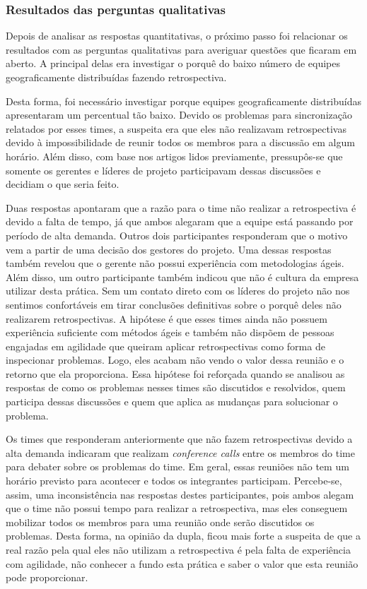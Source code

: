 \subsubsection*{Resultados das perguntas qualitativas}

Depois de analisar as respostas quantitativas, o próximo passo foi relacionar os resultados com as perguntas qualitativas para averiguar questões que ficaram em aberto. A principal delas era investigar o porquê do baixo número de equipes geograficamente distribuídas fazendo retrospectiva.
  
Desta forma, foi necessário investigar porque equipes geograficamente distribuídas apresentaram um percentual tão baixo. Devido os problemas para sincronização relatados por esses times, a suspeita era que eles não realizavam retrospectivas devido à impossibilidade de reunir todos os membros para a discussão em algum horário. Além disso, com base nos artigos lidos previamente, pressupôs-se que somente os gerentes e líderes de projeto participavam dessas discussões e decidiam o que seria feito.

Duas respostas apontaram que a razão para o time não realizar a retrospectiva é devido a falta de tempo, já que ambos alegaram que a equipe está passando por período de alta demanda. Outros dois participantes responderam que o motivo vem a partir de uma decisão dos gestores do projeto. Uma dessas respostas também revelou que o gerente não possui experiência com metodologias ágeis. Além disso, um outro participante também indicou que não é cultura da empresa utilizar desta prática. Sem um contato direto com os líderes do projeto não nos sentimos confortáveis em tirar conclusões definitivas sobre o porquê deles não realizarem retrospectivas. A hipótese é que esses times ainda não possuem experiência suficiente com métodos ágeis e também não dispõem de pessoas engajadas em agilidade que queiram aplicar retrospectivas como forma de inspecionar problemas. Logo, eles acabam não vendo o valor dessa reunião e o retorno que ela proporciona. Essa hipótese foi reforçada quando se analisou as respostas de como os problemas nesses times são discutidos e resolvidos, quem participa dessas discussões e quem que aplica as mudanças para solucionar o problema.

Os times que responderam anteriormente que não fazem retrospectivas devido a alta demanda indicaram que realizam \textit{conference calls} entre os membros do time para debater sobre os problemas do time. Em geral, essas reuniões não tem um horário previsto para acontecer e todos os integrantes participam. Percebe-se, assim, uma inconsistência nas respostas destes participantes, pois ambos alegam que o time não possui tempo para realizar a retrospectiva, mas eles conseguem mobilizar todos os membros para uma reunião onde serão discutidos os problemas. Desta forma, na opinião da dupla, ficou mais forte a suspeita de que a real razão pela qual eles não utilizam a retrospectiva é pela falta de experiência com agilidade, não conhecer a fundo esta prática e saber o valor que esta reunião pode proporcionar.

